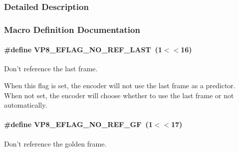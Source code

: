 \subsubsection{Detailed Description}


\subsubsection{Macro Definition Documentation}
\hypertarget{group__vp8__encoder_gafb51c67e5743275146bc1fc425727da3}{
\paragraph[{V\-P8\-\_\-\-E\-F\-L\-A\-G\-\_\-\-N\-O\-\_\-\-R\-E\-F\-\_\-\-L\-A\-S\-T}]{\setlength{\rightskip}{0pt plus 5cm}\#define V\-P8\-\_\-\-E\-F\-L\-A\-G\-\_\-\-N\-O\-\_\-\-R\-E\-F\-\_\-\-L\-A\-S\-T~(1$<$$<$16)}}\label{group__vp8__encoder_gafb51c67e5743275146bc1fc425727da3}


Don't reference the last frame. 

When this flag is set, the encoder will not use the last frame as a predictor. When not set, the encoder will choose whether to use the last frame or not automatically. \hypertarget{group__vp8__encoder_gabb5e95343a2738abef44eca13059da33}{
\paragraph[{V\-P8\-\_\-\-E\-F\-L\-A\-G\-\_\-\-N\-O\-\_\-\-R\-E\-F\-\_\-\-G\-F}]{\setlength{\rightskip}{0pt plus 5cm}\#define V\-P8\-\_\-\-E\-F\-L\-A\-G\-\_\-\-N\-O\-\_\-\-R\-E\-F\-\_\-\-G\-F~(1$<$$<$17)}}\label{group__vp8__encoder_gabb5e95343a2738abef44eca13059da33}


Don't reference the golden frame. 

